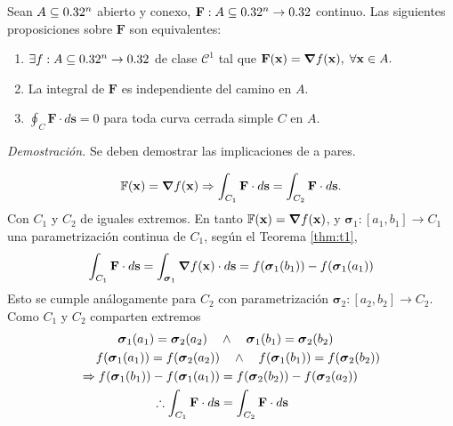 \begin{theorem}
    Sean $A\subseteq0.32^n$ abierto y conexo, $\mathbf{F}:A\subseteq0.32^n\to0.32$ continuo. Las siguientes proposiciones sobre $\mathbf{F}$ son equivalentes:
    \begin{enumerate}
        \item $\exists f:A\subseteq0.32^n\to0.32$ de clase $\mathcal{C}^1$ tal que $\mathbf{F}(\mathbf{x})=\grad f(\mathbf{x}),\;\forall\mathbf{x}\in A.$ 
        \item La integral de $\mathbf{F}$ es independiente del camino en $A$.
        \item $\oint_C\mathbf{F}\cdot d\mathbf{s}=0$ para toda curva cerrada simple $C$ en $A$.
    \end{enumerate}

    \textit{Demostración.}
    Se deben demostrar las implicaciones de a pares. 
    
    \begin{equation}
        \mathbb{F}(\mathbf{x})=\grad f(\mathbf{x}) \Rightarrow \int_{C_1}\mathbf{F}\cdot d\mathbf{s}=\int_{C_2}\mathbf{F}\cdot d\mathbf{s}.
        \label{eq:CampoCons1}
    \end{equation}
    Con $C_1$ y $C_2$ de iguales extremos. En tanto $\mathbb{F}(\mathbf{x})=\grad f(\mathbf{x})$, y $\boldsymbol{\sigma}_1:[a_1,b_1]\to C_1$ una parametrización continua de $C_1$, según el Teorema \ref{thm:t1},
    \begin{equation*}
        \int_{C_1}\mathbf{F}\cdot d\mathbf{s}=\int_{\boldsymbol{\sigma}_1}\grad f(\mathbf{x})\cdot d\mathbf{s}=f(\boldsymbol{\sigma}_1(b_1))-f(\boldsymbol{\sigma}_1(a_1))
    \end{equation*}
    Esto se cumple análogamente para $C_2$ con parametrización $\boldsymbol{\sigma}_2:[a_2,b_2]\to C_2$. Como $C_1$ y $C_2$ comparten extremos
    \begin{align*}
        \boldsymbol{\sigma}_1(a_1)=\boldsymbol{\sigma}_2(a_2) \quad &\land \quad \boldsymbol{\sigma}_1(b_1)=\boldsymbol{\sigma}_2(b_2)\\
        f(\boldsymbol{\sigma}_1(a_1))=f(\boldsymbol{\sigma}_2(a_2)) &\quad \land \quad f(\boldsymbol{\sigma}_1(b_1))=f(\boldsymbol{\sigma}_2(b_2))\\
        \Rightarrow f(\boldsymbol{\sigma}_1(b_1))-f(\boldsymbol{\sigma}_1(a_1))&=f(\boldsymbol{\sigma}_2(b_2))-f(\boldsymbol{\sigma}_2(a_2))\\
        \therefore \int_{C_1}\mathbf{F}\cdot d\mathbf{s}&=\int_{C_2}\mathbf{F}\cdot d\mathbf{s}
    \end{align*}


\end{theorem}
